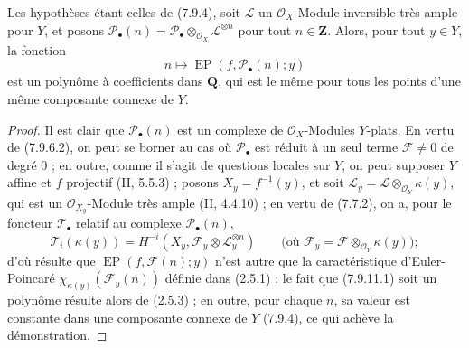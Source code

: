 \begin{proposition}[7.9.11]
\label{III.7.9.11.fr}
Les hypothèses étant celles de (7.9.4), soit $\mathscr L$ un
$\mathscr O_X$-Module inversible très ample pour $Y$, et posons
$\mathscr P_\bullet(n)=\mathscr P_\bullet\otimes_{\mathscr O_X}
\mathscr L^{\otimes n}$ pour tout $n\in\mathbf Z$. Alors, pour tout $y\in Y$,
la fonction
\[
  n\longmapsto\operatorname{EP}(f,\mathscr P_\bullet(n);y)
  \tag{7.9.11.1}\label{III.7.9.11.1.fr}
\]
est un polynôme à coefficients dans $\mathbf Q$, qui est le même pour tous les
points d'une même composante connexe de $Y$.
\end{proposition}

\begin{proof}
Il est clair que $\mathscr P_\bullet(n)$ est un complexe de
$\mathscr O_X$-Modules $Y$-plats. En vertu de (7.9.6.2), on peut se borner au cas
où $\mathscr P_\bullet$ est réduit à un seul terme $\mathscr F\ne0$ de degré 0 ;
en outre, comme il s'agit de questions locales sur $Y$, on peut supposer $Y$
affine et $f$ projectif (II, 5.5.3) ; posons $X_y=f^{-1}(y)$, et soit
$\mathscr L_y=\mathscr L\otimes_{\mathscr O_Y}\kappa(y)$, qui est un
$\mathscr O_{X_y}$-Module très ample (II, 4.4.10) ; en vertu de (7.7.2), on a,
pour le foncteur $\mathscr T_\bullet$ relatif au complexe
$\mathscr P_\bullet(n)$,
\[
  \mathscr T_i(\kappa(y))
  =H^{-i}(X_y,\mathscr F_y\otimes\mathscr L_y^{\otimes n})
  \qquad
  \bigl(\text{où }\mathscr F_y=\mathscr F\otimes_{\mathscr O_Y}\kappa(y)\bigr) ;
\]
d'où résulte que $\operatorname{EP}(f,\mathscr F(n);y)$ n'est autre que la
caractéristique d'Euler-Poincaré $\chi_{\kappa(y)}(\mathscr F_y(n))$ définie dans
(2.5.1) ; le fait que (7.9.11.1) soit un polynôme résulte alors de (2.5.3) ; en
outre, pour chaque $n$, sa valeur est constante dans une composante connexe de
$Y$ (7.9.4), ce qui achève la démonstration.
\end{proof}

